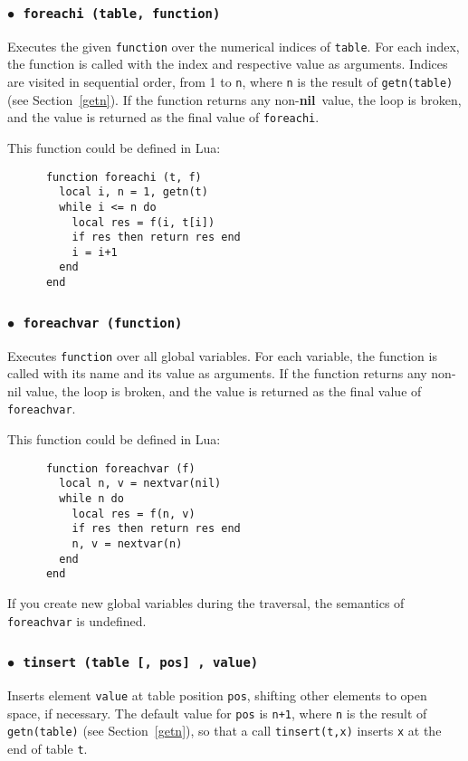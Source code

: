 \documentclass[11pt]{article}
\newcommand{\See}[1]{Section~\ref{#1}}
\newcommand{\see}[1]{(see \See{#1})}
\newcommand{\T}[1]{{\tt #1}}
\newcommand{\nil}{{\bf nil}}
\newcommand{\Deffunc}[1]{\index{#1}}
\newcommand{\ff}{$\bullet$\ }
\begin{document}
\subsubsection*{\ff \T{foreachi (table, function)}}\Deffunc{foreachi}
Executes the given \verb|function| over the
numerical indices of \verb|table|.
For each index, the function is called with the index and
respective value as arguments.
Indices are visited in sequential order,
from 1 to \verb|n|,
where \verb|n| is the result of \verb|getn(table)| \see{getn}.
If the function returns any non-\nil\ value,
the loop is broken, and the value is returned
as the final value of \verb|foreachi|.

This function could be defined in Lua:
\begin{verbatim}
      function foreachi (t, f)
        local i, n = 1, getn(t)
        while i <= n do
          local res = f(i, t[i])
          if res then return res end
          i = i+1
        end
      end
\end{verbatim}

\subsubsection*{\ff \T{foreachvar (function)}}\Deffunc{foreachvar}
Executes \verb|function| over all global variables.
For each variable,
the function is called with its name and its value as arguments.
If the function returns any non-nil value,
the loop is broken, and the value is returned
as the final value of \verb|foreachvar|.

This function could be defined in Lua:
\begin{verbatim}
      function foreachvar (f)
        local n, v = nextvar(nil)
        while n do
          local res = f(n, v)
          if res then return res end
          n, v = nextvar(n)
        end
      end
\end{verbatim}

If you create new global variables during the traversal,
the semantics of \verb|foreachvar| is undefined.

\subsubsection*{\ff \T{tinsert (table [, pos] , value)}}\Deffunc{tinsert}

Inserts element \verb|value| at table position \verb|pos|,
shifting other elements to open space, if necessary.
The default value for \verb|pos| is \verb|n+1|,
where \verb|n| is the result of \verb|getn(table)| \see{getn},
so that a call \verb|tinsert(t,x)| inserts \verb|x| at the end
of table \verb|t|.
\end{document}
